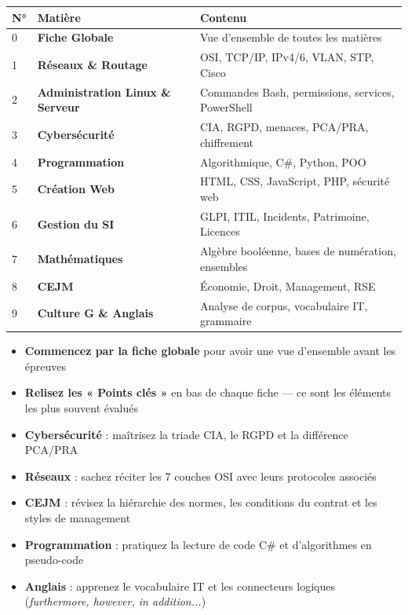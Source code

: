 \documentclass[a4paper,10pt]{article}
\begin{document}
\begin{tcolorbox}[colback=lightbg, colframe=navy, arc=3mm, boxrule=0.5mm]
\renewcommand{\arraystretch}{1.6}
\begin{tabular}{lll}
\textbf{N°} & \textbf{Matière} & \textbf{Contenu} \\
\hline
0 & \textbf{Fiche Globale} & Vue d'ensemble de toutes les matières \\
\hline
1 & \textbf{Réseaux \& Routage} & OSI, TCP/IP, IPv4/6, VLAN, STP, Cisco \\
2 & \textbf{Administration Linux \& Serveur} & Commandes Bash, permissions, services, PowerShell \\
3 & \textbf{Cybersécurité} & CIA, RGPD, menaces, PCA/PRA, chiffrement \\
4 & \textbf{Programmation} & Algorithmique, C\#, Python, POO \\
5 & \textbf{Création Web} & HTML, CSS, JavaScript, PHP, sécurité web \\
6 & \textbf{Gestion du SI} & GLPI, ITIL, Incidents, Patrimoine, Licences \\
7 & \textbf{Mathématiques} & Algèbre booléenne, bases de numération, ensembles \\
8 & \textbf{CEJM} & Économie, Droit, Management, RSE \\
9 & \textbf{Culture G \& Anglais} & Analyse de corpus, vocabulaire IT, grammaire \\
\end{tabular}
\end{tcolorbox}

\vspace{1.5cm}

\begin{tcolorbox}[colback=red!5, colframe=red!70!black, arc=3mm, boxrule=0.5mm, title=\textbf{Conseils pour le BTS Blanc}]
\begin{itemize}
  \item \textbf{Commencez par la fiche globale} pour avoir une vue d'ensemble avant les épreuves
  \item \textbf{Relisez les « Points clés »} en bas de chaque fiche — ce sont les éléments les plus souvent évalués
  \item \textbf{Cybersécurité} : maîtrisez la triade CIA, le RGPD et la différence PCA/PRA
  \item \textbf{Réseaux} : sachez réciter les 7 couches OSI avec leurs protocoles associés
  \item \textbf{CEJM} : révisez la hiérarchie des normes, les conditions du contrat et les styles de management
  \item \textbf{Programmation} : pratiquez la lecture de code C\# et d'algorithmes en pseudo-code
  \item \textbf{Anglais} : apprenez le vocabulaire IT et les connecteurs logiques (\textit{furthermore, however, in addition...})
\end{itemize}
\end{tcolorbox}
\end{document}
